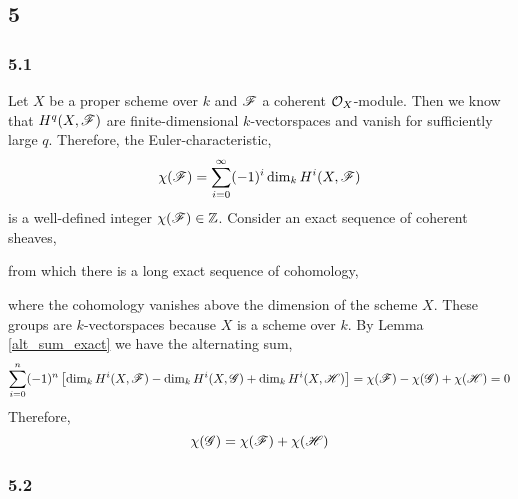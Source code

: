 \documentclass[12pt]{article}
\begin{document}
\subsection{5}

\subsubsection{5.1}

Let $X$ be a proper scheme over $k$ and $\mathscr{F}$ a coherent $\mathcal{O}_{X}$-module. Then we know that $H^q(X, \mathscr{F})$ are finite-dimensional $k$-vectorspaces and vanish for sufficiently large $q$. Therefore, the Euler-characteristic,
\[ \chi(\mathscr{F}) = \sum_{i = 0}^\infty (-1)^i \dim_k H^i(X, \mathscr{F}) \]
is a well-defined integer $\chi(\mathscr{F}) \in \mathbb{Z}$. 
Consider an exact sequence of coherent sheaves,  
\begin{center}
\end{center}
from which there is a long exact sequence of cohomology,
\begin{center}
\end{center}
where the cohomology vanishes above the dimension of the scheme $X$. These groups are $k$-vectorspaces because $X$ is a scheme over $k$. By Lemma \ref{alt_sum_exact} we have the alternating sum,
\begin{align*}
\sum_{i = 0}^n (-1)^n \left[ \dim_k H^i(X, \mathscr{F}) - \dim_k H^i(X, \mathscr{G}) + \dim_k H^i(X, \mathscr{H}) \right] = \chi(\mathscr{F}) - \chi(\mathscr{G}) + \chi(\mathscr{H}) = 0  
\end{align*}
Therefore,
\[ \chi(\mathscr{G}) = \chi(\mathscr{F}) + \chi(\mathscr{H}) \]

\subsubsection{5.2}
\end{document}

